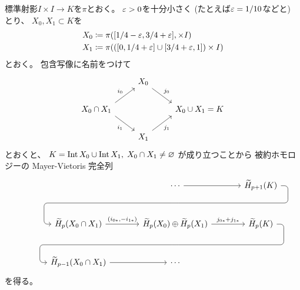 \documentclass[report]{jlreq}
\begin{document}
\begin{answer}
   標準射影$I \times I \to K$を$\pi$とおく。
    $\varepsilon > 0$を十分小さく (たとえば$\varepsilon = 1/10$などと) とり、
    $X_0, X_1 \subset K$を
    \begin{alignat}{1}
        X_0 &\coloneqq \pi([1/4 - \varepsilon, 3/4 + \varepsilon], \times I) \\
        X_1 &\coloneqq \pi(([0, 1/4 + \varepsilon] \cup [3/4 + \varepsilon, 1]) \times I)
    \end{alignat}
    とおく。
    包含写像に名前をつけて
    \begin{equation}
        \begin{tikzcd}
            & X_0
                \ar[end anchor=north west]{rd}{j_0} \\
            X_0 \cap X_1
                \ar[start anchor=north east]{ru}{i_0}
                \ar[start anchor=south east]{rd}[swap]{i_1}
                && X_0 \cup X_1 = K \\
            & X_1
                \ar[end anchor=south west]{ru}[swap]{j_1}
        \end{tikzcd}
    \end{equation}
    とおくと、
    $K = \operatorname{Int} X_0 \cup \operatorname{Int} X_1, \; X_0 \cap X_1 \neq \varnothing$
    が成り立つことから
    被約ホモロジーの Mayer-Vietoris 完全列
    \begin{equation}
        \begin{tikzcd}[column sep=large, row sep=large]
            && \cdots
                \ar{r} \ar[phantom]{d}[name=X1, anchor=center]{}
                & \widetilde{H}_{p+1}(K)
                    \ar[rounded corners,
                        to path={
                            -- ([xshift=2ex]\tikztostart.east)
                            |- (X1.center) \tikztonodes
                            -| ([xshift=-2ex]\tikztotarget.west)
                            -- (\tikztotarget)
                        }]{dll} \\
            & \widetilde{H}_p(X_0 \cap X_1)
                \ar{r}{(i_{0*}, -i_{1*})}
                & \widetilde{H}_p(X_0) \oplus \widetilde{H}_p(X_1)
                    \ar{r}{j_{0*} + j_{1*}}
                    \ar[phantom]{d}[name=X2, anchor=center]{}
                & \widetilde{H}_p(K)
                    \ar[rounded corners,
                        to path={
                            -- ([xshift=2ex]\tikztostart.east)
                            |- (X2.center) \tikztonodes
                            -| ([xshift=-2ex]\tikztotarget.west)
                            -- (\tikztotarget)
                        }]{dll} \\
            & \widetilde{H}_{p-1}(X_0 \cap X_1)
                \ar{r}
                & \cdots
        \end{tikzcd}
    \end{equation}
    を得る。


\end{answer}
\end{document}
